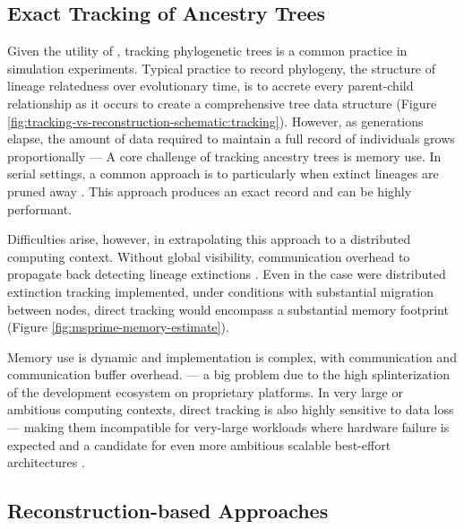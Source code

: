 

\subsection{Exact Tracking of Ancestry Trees}

Given the utility of , tracking phylogenetic trees is a common practice in simulation experiments.
Typical practice to record phylogeny, the structure of lineage relatedness over evolutionary time, is to accrete every parent-child relationship as it occurs to create a comprehensive tree data structure \citep{moreno2024algorithms} (Figure \ref{fig:tracking-vs-reconstruction-schematic:tracking}).
However, as generations elapse, the amount of data required to maintain a full record of individuals grows proportionally ---
A core challenge of tracking ancestry trees is memory use.
In serial settings, a common approach is to particularly when extinct lineages are pruned away \citep{dolson2024phylotrackpy}.
This approach produces an exact record and can be highly performant.

Difficulties arise, however, in extrapolating this approach to a distributed computing context.
Without global visibility, communication overhead to propagate back detecting lineage extinctions \citep{moreno2024algorithms}.
Even in the case were distributed extinction tracking implemented, under conditions with substantial migration between nodes, direct tracking would encompass a substantial  memory footprint (Figure \ref{fig:msprime-memory-estimate}).


Memory use is dynamic and implementation is complex, with communication and communication buffer overhead.
 --- a big problem due to the high splinterization of the development ecosystem on proprietary platforms.
In very large or ambitious computing contexts, direct tracking is also highly sensitive to data loss --- making them incompatible for very-large workloads where hardware failure is expected and a candidate for even more ambitious scalable best-effort architectures \citep{TODOackley}.

\subsection{Reconstruction-based Approaches}

